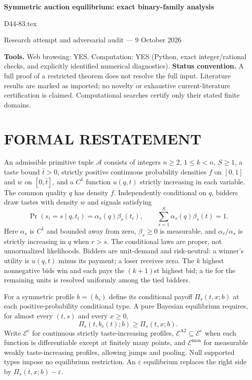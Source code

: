 \documentclass[11pt,a4paper]{article}
\theoremstyle{remark}\newtheorem{remark}[theorem]{Remark}
\begin{document}
\begin{center}
{\LARGE\bfseries Symmetric auction equilibrium: exact binary-family analysis}\par\medskip
{\large D44-83.tex}\par
Research attempt and adversarial audit --- 9 October 2026
\end{center}
\label{problem:OP-0592}
\label{supp:auction-existence}
\textbf{Tools.} Web browsing: YES. Computation: YES (Python, exact integer/rational checks, and explicitly identified numerical diagnostics).
\textbf{Status convention.} A full proof of a restricted theorem does not resolve the full input. Literature results are marked as imported; no novelty or exhaustive current-literature certification is claimed. Computational searches certify only their stated finite domains.

\section{FORMAL RESTATEMENT}
An admissible primitive tuple $\mathcal A$ consists of integers $n\ge2$, $1\le k<n$, $S\ge1$, a taste bound $\bar t>0$, strictly positive continuous probability densities $f$ on $[0,1]$ and $w$ on $[0,\bar t]$, and a $C^1$ function $u(q,t)$ strictly increasing in each variable. The common quality $q$ has density $f$. Independently conditional on $q$, bidders draw tastes with density $w$ and signals satisfying
\[
 \Pr(s_i=s\mid q,t_i)=\alpha_s(q)\beta_s(t_i),\qquad
 \sum_{s=1}^S\alpha_s(q)\beta_s(t)=1.
\]
Here $\alpha_s$ is $C^1$ and bounded away from zero, $\beta_s\ge0$ is measurable, and $\alpha_r/\alpha_s$ is strictly increasing in $q$ when $r>s$. The conditional laws are proper, not unnormalized likelihoods. Bidders are unit-demand and risk-neutral: a winner's utility is $u(q,t)$ minus its payment; a loser receives zero. The $k$ highest nonnegative bids win and each pays the $(k+1)$st highest bid; a tie for the remaining units is resolved uniformly among the tied bidders.

For a symmetric profile $b=(b_s)$ define its conditional payoff $\Pi_s(t,x;b)$ at each positive-probability conditional type. A pure Bayesian equilibrium requires, for almost every $(t,s)$ and every $x\ge0$,
\[
 \Pi_s(t,b_s(t);b)\ge\Pi_s(t,x;b).
\]
Write $\mathcal E^{\mathrm c}$ for continuous strictly taste-increasing profiles, $\mathcal E^{\mathrm{A2}}\subseteq\mathcal E^{\mathrm c}$ when each function is differentiable except at finitely many points, and $\mathcal E^{\mathrm{mon}}$ for measurable weakly taste-increasing profiles, allowing jumps and pooling. Null supported types impose no equilibrium restriction. An $\varepsilon$ equilibrium replaces the right side by $\Pi_s(t,x;b)-\varepsilon$.
\end{document}
